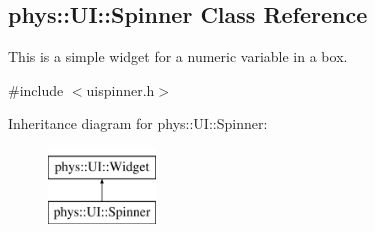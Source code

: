 \hypertarget{classphys_1_1UI_1_1Spinner}{
\subsection{phys::UI::Spinner Class Reference}
\label{classphys_1_1UI_1_1Spinner}
}


This is a simple widget for a numeric variable in a box.  




{\ttfamily \#include $<$uispinner.h$>$}

Inheritance diagram for phys::UI::Spinner:\begin{figure}[H]
\begin{center}
\leavevmode
\includegraphics[height=2.000000cm]{classphys_1_1UI_1_1Spinner}
\end{center}
\end{figure}
